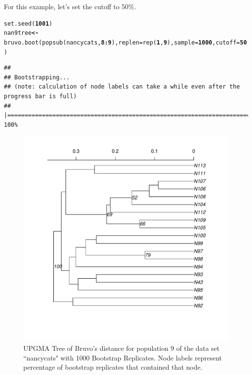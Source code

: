 \documentclass[letterpaper]{article}\usepackage[]{graphicx}\usepackage[]{color}
\makeatletter
\newcommand{\hlnum}[1]{\textcolor[rgb]{0.502,0,0.502}{\textbf{#1}}}%
\newcommand{\hlopt}[1]{\textcolor[rgb]{1,0,0.502}{\textbf{#1}}}%
\newcommand{\hlstd}[1]{\textcolor[rgb]{0,0,0}{#1}}%
\newcommand{\hlkwb}[1]{\textcolor[rgb]{0.502,0.502,0.753}{\textbf{#1}}}%
\newcommand{\hlkwc}[1]{\textcolor[rgb]{0,0.502,0.753}{#1}}%
\newcommand{\hlkwd}[1]{\textcolor[rgb]{0,0.267,0.4}{#1}}%
\newenvironment{kframe}{%
 \def\at@end@of@kframe{}%
 \ifinner\ifhmode%
  \def\at@end@of@kframe{\end{minipage}}%
  \begin{minipage}{\columnwidth}%
 \fi\fi%
 \def\FrameCommand##1{\hskip\@totalleftmargin \hskip-\fboxsep
 \colorbox{shadecolor}{##1}\hskip-\fboxsep
     \hskip-\linewidth \hskip-\@totalleftmargin \hskip\columnwidth}%
 \MakeFramed {\advance\hsize-\width
   \@totalleftmargin\z@ \linewidth\hsize
   \@setminipage}}%
 {\par\unskip\endMakeFramed%
 \at@end@of@kframe}
\newenvironment{knitrout}{}{} %
\makeatother
\begin{document}
For this example, let's set the cutoff to 50\%.
\begin{knitrout}\footnotesize
{}\color{fgcolor}\begin{kframe}
\begin{alltt}
\hlkwd{set.seed}\hlstd{(}\hlnum{1001}\hlstd{)}
\hlstd{nan9tree} \hlkwb{<-} \hlkwd{bruvo.boot}\hlstd{(}\hlkwd{popsub}\hlstd{(nancycats,} \hlnum{8}\hlopt{:}\hlnum{9}\hlstd{),} \hlkwc{replen} \hlstd{=} \hlkwd{rep}\hlstd{(}\hlnum{1}\hlstd{,} \hlnum{9}\hlstd{),} \hlkwc{sample} \hlstd{=} \hlnum{1000}\hlstd{,} \hlkwc{cutoff} \hlstd{=} \hlnum{50}\hlstd{)}
\end{alltt}
\end{kframe}
\end{knitrout}

\begin{knitrout}\footnotesize
{}\color{fgcolor}\begin{kframe}
\begin{verbatim}
## 
## Bootstrapping...
## (note: calculation of node labels can take a while even after the progress bar is full)
## |================================================================================| 100%
\end{verbatim}
\end{kframe}
\end{knitrout}

\begin{figure}[h!]
  \centering
  \caption{\footnotesize UPGMA Tree of Bruvo's distance for population 9 of the data set ``nancycats" with 1000 Bootstrap Replicates. Node labels represent percentage of bootstrap replicates that contained that node.}
  \label{bruvo_upgma}

\begin{knitrout}\footnotesize
{}\color{fgcolor}

{\centering \includegraphics[width=0.5\linewidth]{figure/bruvo_tree} 

}



\end{knitrout}


\end{figure}
\newpage
\end{document}
